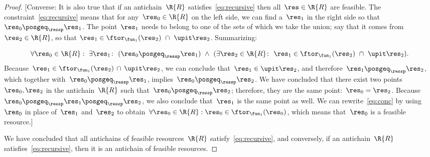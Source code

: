 \begin{proof}
    {[}Converse: It is also true that if an antichain~$\R{R}$ satisfies~\cref{eq:recursive}
    then all~$\res\in\R{R}$ are feasible. The constraint~\cref{eq:recursive}
    means that for any~$\res_{0}\in\R{R}$ on the left side, we can find
    a~$\res_{1}$ in the right side so that~$\res_{0}\posgeq_{\ressp}\res_{1}$.
    The point~$\res_{1}$ needs to belong to one of the sets of which
    we take the union; say that it comes from $\res_{2}\in\R{R}$, so
    that $\res_{1}\in\ftor_{\fun_{1}}(\res_{2})\ \cap\ \upit\res_{2}$.
    Summarizing:

        {\footnotesize{}
        \begin{equation}
            \forall\res_{0}\in\R{R}:\ \exists\res_{1}\colon\ (\res_{0}\posgeq_{\ressp}\res_{1})\ \wedge\ (\exists\res_{2}\in\R{R}\colon\ \res_{1}\in\ftor_{\fun_{1}}(\res_{2})\ \cap\ \upit\res_{2}).\label{eq:conc}
        \end{equation}
    }Because~$\res_{1}\in\ftor_{\fun_{1}}(\res_{2})\,\cap\,\upit\res_{2}$,
    we can conclude that~$\res_{1}\in\upit\res_{2}$, and therefore~$\res_{1}\posgeq_{\ressp}\res_{2}$,
    which together with~$\res_{0}\posgeq_{\ressp}\res_{1}$, implies~$\res_{0}\posgeq_{\ressp}\res_{2}$.
    We have concluded that there exist two points~$\res_{0},\res_{2}$
    in the antichain~$\R{R}$ such that~$\res_{0}\posgeq_{\ressp}\res_{2}$;
    therefore, they are the same point:~$\res_{0}=\res_{2}$. Because~$\res_{0}\posgeq_{\ressp}\res_{1}\posgeq_{\ressp}\res_{2}$,
    we also conclude that~$\res_{1}$ is the same point as well. We can
    rewrite~\cref{eq:conc} by using~$\res_{0}$ in place of~$\res_{1}$
    and~$\res_{2}$ to obtain~$\forall\res_{0}\in\R{R}:\res_{0}\in\ftor_{\fun_{1}}(\res_{0})$,
    which means that~$\res_{0}$ is a feasible resource.{]}

    We have concluded that all antichains of feasible resources~$\R{R}$
    satisfy~\cref{eq:recursive}, and conversely, if an antichain~$\R{R}$
    satisfies~\cref{eq:recursive}, then it is an antichain of feasible
    resources.


\end{proof}
